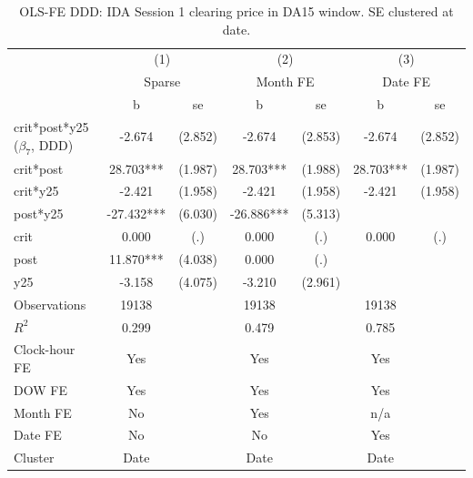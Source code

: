 \begin{table}[htbp]\centering
\def\sym#1{\ifmmode^{#1}\else\(^{#1}\)\fi}
\caption{OLS-FE DDD: IDA Session 1 clearing price in DA15 window. SE clustered at date.}\label{tab:reform_ddd_da15_ida}
\begin{tabular}{l*{3}{cc}}
\toprule
                    &\multicolumn{2}{c}{(1)}     &\multicolumn{2}{c}{(2)}     &\multicolumn{2}{c}{(3)}     \\
                    &\multicolumn{2}{c}{Sparse}  &\multicolumn{2}{c}{Month FE}&\multicolumn{2}{c}{Date FE} \\
                    &           b   &          se&           b   &          se&           b   &          se\\
\midrule
crit*post*y25 ($\beta_7$, DDD)&      -2.674   &     (2.852)&      -2.674   &     (2.853)&      -2.674   &     (2.852)\\
crit*post           &      28.703***&     (1.987)&      28.703***&     (1.988)&      28.703***&     (1.987)\\
crit*y25            &      -2.421   &     (1.958)&      -2.421   &     (1.958)&      -2.421   &     (1.958)\\
post*y25            &     -27.432***&     (6.030)&     -26.886***&     (5.313)&               &            \\
crit                &       0.000   &         (.)&       0.000   &         (.)&       0.000   &         (.)\\
post                &      11.870***&     (4.038)&       0.000   &         (.)&               &            \\
y25                 &      -3.158   &     (4.075)&      -3.210   &     (2.961)&               &            \\
\midrule
Observations        &       19138   &            &       19138   &            &       19138   &            \\
$R^2$               &       0.299   &            &       0.479   &            &       0.785   &            \\
Clock-hour FE       &         Yes   &            &         Yes   &            &         Yes   &            \\
DOW FE              &         Yes   &            &         Yes   &            &         Yes   &            \\
Month FE            &          No   &            &         Yes   &            &         n/a   &            \\
Date FE             &          No   &            &          No   &            &         Yes   &            \\
Cluster             &        Date   &            &        Date   &            &        Date   &            \\
\bottomrule
\end{tabular}
\end{table}

